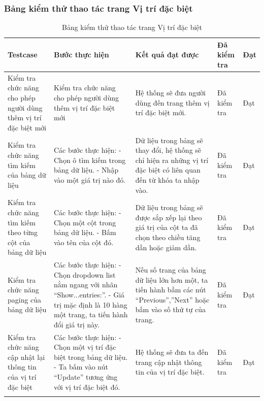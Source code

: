 \documentclass{article}
\begin{document}
\subsubsection{Bảng kiểm thử thao tác trang Vị trí đặc biệt}
\begin{longtable}{ | p{} |p{} | p{}  | p{}  | p{}  | } 
\hline
\textbf{Testcase}& \textbf{Bước thực hiện}& \textbf{Kết quả đạt được} & \textbf{Đã kiểm tra}& \textbf{Đạt} \\ 
\hline
\hline
Kiểm tra chức năng cho phép người dùng thêm vị trí đặc biệt mới &
Kiểm tra chức năng cho phép người dùng thêm vị trí đặc biệt mới 
&
Hệ thống sẽ đưa người dùng đến trang thêm vị trí đặc biệt mới.
&
Đã kiểm tra &
Đạt \\

\hline
Kiểm tra chức năng tìm kiếm của bảng dữ liệu &
Các bước thực hiện: \newline
- Chọn ô tìm kiếm trong bảng dữ liệu.  \newline
- Nhập vào một giá trị nào đó.  \newline 
&
Dữ liệu trong bảng sẽ thay đổi, hệ thống sẽ chỉ hiện ra những vị trí đặc biệt có liên quan đến từ khóa ta nhập vào.
&
Đã kiểm tra &
Đạt \\

\hline
Kiểm tra chức năng tìm kiếm theo từng cột của bảng dữ liệu &
Các bước thực hiện: \newline
- Chọn một cột trong bảng dữ liệu.  \newline
- Bấm vào tên của cột đó.   \newline 
&
Dữ liệu trong bảng sẽ được sắp xếp lại theo giá trị của cột ta đã chọn theo chiều tăng dần hoặc giảm dần.
&
Đã kiểm tra &
Đạt \\

\hline
Kiểm tra chức năng paging của bảng dữ liệu &
Các bước thực hiện: \newline
- Chọn dropdown list nằm ngang với nhãn “Show...entries:”.  \newline
- Giá trị mặc định là 10 hàng một trang, ta tiến hành đổi giá trị này.   \newline 
&
Nếu số trang của bảng dữ liệu lớn hơn một, ta tiến hành bầm các nút “Previous”,”Next” hoặc bấm vào số thứ tự của trang.
&
Đã kiểm tra &
Đạt \\

\hline
Kiểm tra chức năng cập nhật lại thông tin của vị trí đặc biệt &
Các bước thực hiện: \newline
- Chọn một vị trí đặc biệt trong bảng dữ liệu.   \newline
- Ta bấm vào nút “Update” tương ứng với vị trí đặc biệt đó.
&
Hệ thống sẽ đưa ta đến trang cập nhật thông tin của vị trí đặc biệt.
&
Đã kiểm tra &
Đạt \\
\hline
\caption{Bảng kiểm thử thao tác trang Vị trí đặc biệt}
\end{longtable}
\end{document}
